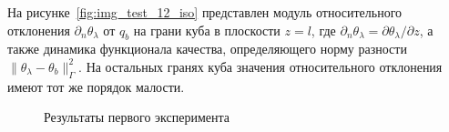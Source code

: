 \documentclass[12pt]{article}
\begin{document}
    На рисунке~\ref{fig:img_test_12_iso} представлен модуль относительного отклонения $\partial_n\theta_\lambda$ от $q_b$
    на грани куба в плоскости $z=l$, где $\partial_n\theta_\lambda=\partial\theta_\lambda/\partial z$,
    а также динамика функционала качества, определяющего норму разности $\|\theta_\lambda -\theta_b\|^2_\Gamma$.
    На остальных гранях куба значения относительного отклонения имеют тот же порядок малости.

    \begin{figure}[H]
        \centering
        \caption{Результаты первого эксперимента}
    \end{figure}
\end{document}
